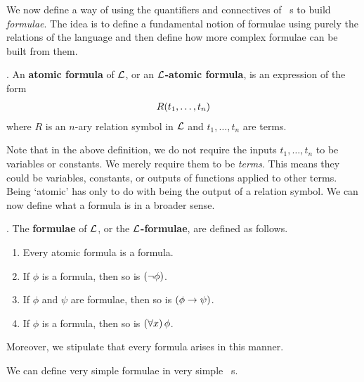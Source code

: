 We now define a way of using the quantifiers and connectives of \fola~s to build \textit{formulae}. The idea is to define a fundamental notion of formulae using purely the relations of the language and then define how more complex formulae can be built from them.

\begin{boxdefinition}\label{Ch2:Def:AtomicFormula_FO_Logic}
    \Letla. An \textbf{atomic formula} of $\mathcal{L}$, or an \textbf{$\mathcal{L}$-atomic formula}, is an expression of the form
    \begin{align*}
        R\!\left( t_1, \ldots, t_n \right)
    \end{align*}
    where $R$ is an $n$-ary relation symbol in $\mathcal{L}$ and $t_1, \ldots, t_n$ are terms.
\end{boxdefinition}

Note that in the above definition, we do not require the inputs $t_1, \ldots, t_n$ to be variables or constants. We merely require them to be \textit{terms}. This means they could be variables, constants, or outputs of functions applied to other terms. Being `atomic' has only to do with being the output of a relation symbol. We can now define what a formula is in a broader sense.

\begin{boxdefinition}[Formula]\label{Ch2:Def:Formula_FO_Logic}
    \Letla. The \textbf{formulae} of $\mathcal{L}$, or the \textbf{$\mathcal{L}$-formulae}, are defined as follows.
    \begin{enumerate}
        \item Every atomic formula is a formula.
        \item If $\phi$ is a formula, then so is $\left( \neg \phi \right)$.
        \item If $\phi$ and $\psi$ are formulae, then so is $\left( \phi \to \psi \right)$.
        \item If $\phi$ is a formula, then so is $\left( \forall x \right) \phi$.
    \end{enumerate}
    Moreover, we stipulate that every formula arises in this manner.
\end{boxdefinition}

We can define very simple formulae in very simple \fola~s.

